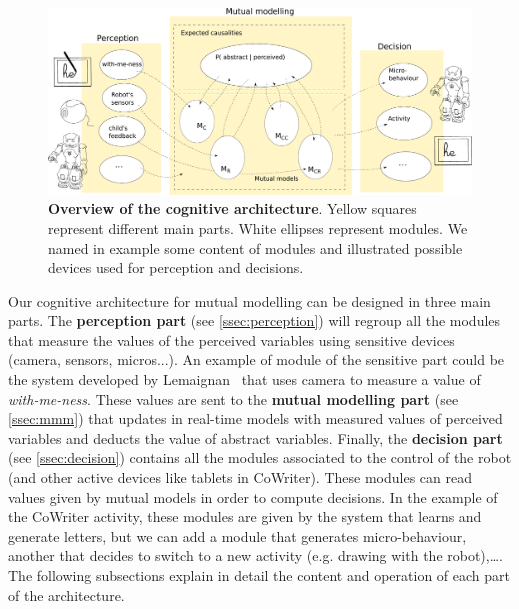 \documentclass[conference]{IEEEtran}
\begin{document}
\begin{figure}[!]
\centering
\includegraphics[width=1\columnwidth]{cognitive_archi}
\caption{\small\textbf{Overview of the cognitive architecture}. Yellow squares represent different main parts. White ellipses represent modules. We named in example some content of modules and illustrated possible devices used for perception and decisions. }
\label{cog}
\end{figure}
Our cognitive architecture for mutual modelling can be designed in three main parts. 
The \textbf{perception part} (see \ref{ssec:perception}) will regroup all the modules that measure the values of the perceived variables using sensitive devices (camera, sensors, micros...). 
An example of module of the sensitive part could be the system developed by Lemaignan~\cite{lemaignan2016realtime} that uses camera to measure a value of \textit{with-me-ness}. 
These values are sent to the \textbf{mutual modelling part} (see \ref{ssec:mmm}) that updates in real-time models with measured values of perceived variables and deducts the value of abstract variables. Finally, the \textbf{decision part} (see \ref{ssec:decision}) contains all the modules associated to the control of the robot (and other active devices like tablets in CoWriter). These modules can read values given by mutual models in order to compute decisions. In the example of the CoWriter activity, these modules are given by the system that learns and generate letters, but we can add a module that generates micro-behaviour, another that decides to switch to a new activity (e.g. drawing with the robot),\dots. The following subsections explain in detail the content and operation of each part of the architecture. 
\end{document}
